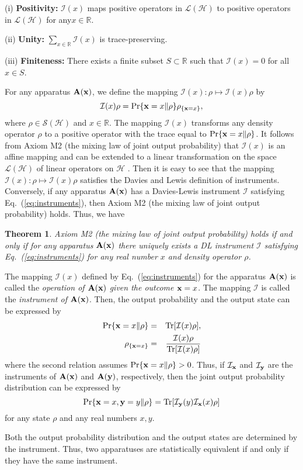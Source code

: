 \documentclass[graybox]{svmult}
\newcommand{\eeq}{\end{equation}}
\newcommand{\beql}[1]{\begin{equation}\label{eq:#1}}
\newcommand{\beqa}{\begin{eqnarray}}
\newcommand{\eeqa}{\end{eqnarray}}
\newcommand{\bA}{{\bf A}}
\newcommand{\cH}{{\mathcal H}}
\newcommand{\cI}{{\mathcal I}}
\newcommand{\cL}{{\mathcal L}}
\newcommand{\cS}{{\mathcal S}}
\newcommand{\rh}{\rho}
\newcommand{\tc}{\cL}
\newcommand{\Eq}[1]{Eq.~(\ref{eq:#1})}
\newcommand{\Tr}{\mbox{\rm Tr}}
\newcommand{\bx}{{\bf x}}
\newcommand{\by}{{\bf y}}
\newtheorem{Theorem}{Theorem}
\newcommand{\R}{\mathbb{R}}
\begin{document}
 (i) {\bf Positivity:}
$\cI(x)$ maps positive operators in $\tc(\cH)$ to positive operators
in $\tc(\cH)$ for any$x\in\R$.

 (ii) {\bf Unity:}  $\sum_{x\in\R}\cI(x)$ is trace-preserving.


 (iii) {\bf Finiteness: } There exists a finite subset $S\subset \R$
 such that $\cI(x)=0$ for all $x\in S$.
 
For any apparatus $\bA(\bx)$, 
we define the mapping $\cI(x):\rh\mapsto \cI(x)\rh$
by 
\beql{instruments}
\cI(x)\rh=\Pr\{\bx=x\|\rh\}\rh_{\{\bx=x\}},
\eeq
where $\rh\in\cS(\cH)$ and $x\in\R$.
The mapping $\cI(x)$  transforms any density operator $\rh$ to
a positive operator with the trace
equal to $\Pr\{\bx=x\|\rh\}$.
It follows from Axiom M2 (the mixing law of joint output probability) that $\cI(x)$
is an affine mapping and can be extended to a linear 
transformation on the space $\tc(\cH)$ of linear operators 
on $\cH$ \cite{97OQ,00MN}.
Then it is easy to see that the mapping $\cI(x):\rh\mapsto \cI(x)\rh$ satisfies the
Davies and Lewis definition of instruments.
Conversely, if any apparatus $\bA(\bx)$ has a Davies-Lewis instrument $\cI$ 
satisfying \Eq{instruments}, then Axiom M2 (the mixing law of joint output probability)
holds. 
Thus, we have \cite{00MN} 

\begin{Theorem}
\label{th:instrument}
Axiom M2 (the mixing law of joint output probability) holds if and only if 
for any apparatus $\bA(\bx)$ there uniquely exists 
a DL instrument $\cI$ satisfying \Eq{instruments}
for any real number $x$ and  density operator $\rh$.
\end{Theorem}

The mapping  $\cI(x)$ defined by \Eq{instruments} for  the apparatus $\bA(\bx)$ 
is called 
the {\em operation of $\bA(\bx)$ given the outcome  $\bx=x$}. The mapping $\cI$
is called the {\em instrument of $\bA(\bx)$}.
Then, the output probability and the output state can be
expressed by
\beqa
\Pr\{\bx=x\|\rh\}&=&\Tr[\cI(x)\rh],
\label{eq:DL1}\\
\rh_{\{\bx=x\}}&=&\frac{\cI(x)\rh}{\Tr[\cI(x)\rh]}
\label{eq:DL2}
\eeqa
where the second relation assumes $\Pr\{\bx=x\|\rh\}>0$.
Thus, if $\cI_{\bx}$ and $\cI_{\by}$ are the instruments
of $\bA(\bx)$ and $\bA(\by)$, respectively, 
then the joint output probability distribution can be expressed by
\beql{JOPD1}
\Pr\{\bx=x,\by=y\|\rh\}
=\Tr[\cI_{\by}(y)\cI_{\bx}(x)\rh]
\eeq
for any state $\rh$ and any real numbers $x,y$.

Both the output probability distribution and the output states
are determined by the instrument.  Thus,
two apparatuses are statistically equivalent if and only if 
they have the same instrument.
\end{document}

